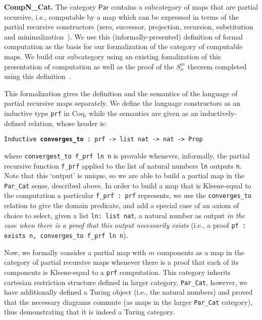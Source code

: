 \documentclass{entcs} \usepackage{entcsmacro}
\begin{document}
{\bfseries CompN\_Cat.} The category $\mathsf{Par}$ contains a subcategory of maps that are partial recursive, i.e., computable by a map which can be expressed in terms of the partial recursive constructors (zero, successor, projection, recursion, substitution and minimalization~\cite{Computability}). We use this (informally-presented) definition of formal computation as the basis for our formalization of the category of computable maps. We build our subcategory using an existing fomalization of this presentation of computation as well as the proof of the $S^m_n$ theorem completed using this definition~\cite{SmnForm}.

This formalization gives the definition and the semantics of the
language of partial recursive maps separately. We define the language
constructors as an inductive type {\tt prf} in Coq, while the
semantics are given as an inductively-defined relation, whose header is:

{\tt \small Inductive {\bfseries converges\_to} : prf -> list nat -> nat -> Prop} 

\noindent where {\tt convergest\_to f\_prf ln n} is provable whenever,
informally, the partial recursive function {\tt f\_prf} applied to the
list of natural numbers {\tt ln} outputs {\tt n}. Note that this
`output' is unique, so we are able to build a partial map in the {\tt
  Par\_Cat} sense, described above. In order to build a map that is
Kleene-equal to the computation a particular {\tt f\_prf : prf}
represents, we use the {\tt converges\_to} relation to give the domain
predicate, and add a special case of an axiom of choice to select,
given a list {\tt ln: list nat}, a natural number as output \textit{in
  the case when there is a proof that this output necessarily exists}
(i.e., a proof {\tt pf : exists n, converges\_to f\_prf ln n}).

Now, we formally consider a partial map with $m$ components as a map in the category of partial recursive maps whenever there is a proof that each of its components is Kleene-equal to a {\tt prf} computation. This category inherits cartesian restriction structure defined in larger category, {\tt Par\_Cat}, however, we have additionally defined a Turing object (i.e., the natural numbers) and proved that the necessary diagrams commute (as maps in the larger {\tt Par\_Cat} category), thus demonstrating that it is indeed a Turing category.
\end{document}
